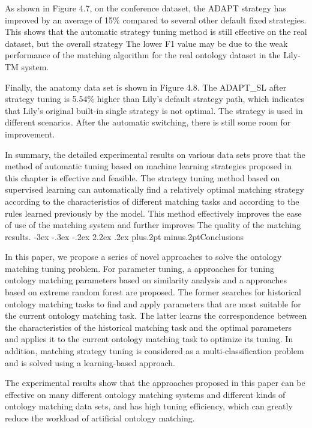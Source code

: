 \documentclass[twoside]{article}
\makeatletter
\def\section{\@startsection{section}{1}{\z@}%
 {-3ex \@plus -.3ex \@minus -.2ex}%
 {2.2ex \@plus.2ex}%
{\normalfont\normalsize\protect\baselineskip=14.5pt plus.2pt minus.2pt\bfseries}}
\makeatother
\begin{document}
As shown in Figure 4.7, on the conference dataset, the ADAPT strategy has improved by an average of 15\% compared to several other default fixed strategies. This shows that the automatic strategy tuning method is still effective on the real dataset, but the overall strategy The lower F1 value may be due to the weak performance of the matching algorithm for the real ontology dataset in the Lily-TM system.

Finally, the anatomy data set is shown in Figure 4.8. The ADAPT\_SL after strategy tuning is 5.54\% higher than Lily's default strategy path, which indicates that Lily's original built-in single strategy is not optimal. The strategy is used in different scenarios. After the automatic switching, there is still some room for improvement.

In summary, the detailed experimental results on various data sets prove that the method of automatic tuning based on machine learning strategies proposed in this chapter is effective and feasible.
The strategy tuning method based on supervised learning can automatically find a relatively optimal matching strategy according to the characteristics of different matching tasks and according to the rules learned previously by the model.
This method effectively improves the ease of use of the matching system and further improves The quality of the matching results.
\section{Conclusions}

In this paper, we propose a series of novel approaches to solve the ontology matching tuning problem.
For parameter tuning, a approaches for tuning ontology matching parameters based on similarity analysis and a approaches based on extreme random forest are proposed.
The former searches for historical ontology matching tasks to find and apply parameters that are most suitable for the current ontology matching task.
The latter learns the correspondence between the characteristics of the historical matching task and the optimal parameters and applies it to the current ontology matching task to optimize its tuning.
In addition, matching strategy tuning is considered as a multi-classification problem and is solved using a learning-based approach.

The experimental results show that the approaches proposed in this paper can be effective on many different ontology matching systems and different kinds of ontology matching data sets, and has high tuning efficiency, which can greatly reduce the workload of artificial ontology matching.
\end{document}
